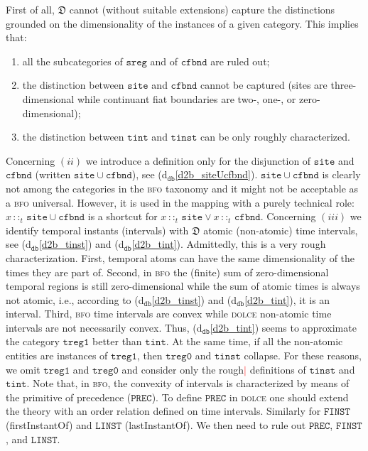 \documentclass[ao]{iosart2x}
\newcommand{\nb}[1]{\textcolor{red}{$|$}\marginpar{\hspace*{-0cm}\parbox{20mm}{\scriptsize\raggedright\textcolor{red}{#1}}}}
\newcommand{\dbDefLabel}{\textrm{d$_\texttt{db}$}}
\newcommand{\refdbdf}[1]{({\dbDefLabel}\ref{#1})}
\newcommand{\pr}[1]{\mathtt{#1}}
\newcommand{\cn}[1]{\mathtt{#1}}
\newcommand{\dolce}{{\textsc{dolce}}}
\newcommand{\bfo}{{\textsc{bfo}}}
\newcommand {\thdolce} {\ensuremath{\mathfrak{D}}}
\newcommand{\sitebcat}{\cn{site}}
\newcommand{\cfbndbcat}{\cn{cfbnd}}
\newcommand{\sregbcat}{\cn{sreg}}
\newcommand{\tinstbcat}{\cn{tinst}}
\newcommand{\tintbcat}{\cn{tint}}
\newcommand{\onetregbcat}{\cn{treg1}}
\newcommand{\zerotregbcat}{\cn{treg0}}
\newcommand{\bfoiof}[1]{{\,::_{#1\:\!}}}
\begin{document}
First of all, {$\thdolce$} cannot (without suitable extensions) capture the distinctions grounded on the dimensionality of the instances of a given category. This implies that: 
\begin{enumerate}[$(i)$]
\item all the subcategories of $\sregbcat$ and of $\cfbndbcat$ are ruled out; 
\item the distinction between $\sitebcat$ and $\cfbndbcat$ cannot be captured (sites are three-dimensional while continuant fiat boundaries are two-, one-, or zero-dimensional); 
\item the distinction between $\tintbcat$ and $\tinstbcat$ can be only roughly characterized.
\end{enumerate} 

Concerning $(ii)$ we introduce a definition only for the disjunction of $\sitebcat$ and $\cfbndbcat$ (written $\sitebcat{\cup}\cfbndbcat$), see \refdbdf{d2b_siteUcfbnd}. $\sitebcat{\cup}\cfbndbcat$ is clearly not among the categories in the {\bfo} taxonomy and it might not be acceptable as a {\bfo} universal. However, it is used in the mapping with a purely technical role: $x \bfoiof{t} \sitebcat{\cup}\cfbndbcat$ is a shortcut for $x \bfoiof{t} \sitebcat \lor x \bfoiof{t}\cfbndbcat$. %
Concerning $(iii)$ we identify temporal instants (intervals) with $\thdolce$ atomic (non-atomic) time intervals, see \refdbdf{d2b_tinst} and \refdbdf{d2b_tint}. Admittedly, this is a very rough characterization. First, temporal atoms can have the same dimensionality of the times they are part of. Second, in {\bfo} the (finite) sum of zero-dimensional temporal regions is still zero-dimensional while the sum of atomic times is always not atomic, i.e., according to \refdbdf{d2b_tinst} and \refdbdf{d2b_tint}, {it is} an interval. Third, {\bfo} time intervals are convex while {\dolce} non-atomic time intervals are not necessarily convex. Thus, \refdbdf{d2b_tint} seems to approximate the category $\onetregbcat$ better than $\tintbcat$. At the same time, if all the non-atomic entities are instances of  $\onetregbcat$, then $\zerotregbcat$ and $\tinstbcat$ collapse. For these reasons, we omit $\onetregbcat$ and $\zerotregbcat$ and 
consider only the rough\nb{SB: perch\`e rough? si pu\`o togliere?} definitions of $\tinstbcat$ and $\tintbcat$. Note that, in {\bfo}, the convexity of intervals is characterized by means of the primitive of precedence ($\pr{PREC}$). To define $\pr{PREC}$ in {\dolce} one should extend the theory with an order relation defined on time intervals. Similarly for $\pr{FINST}$ (firstInstantOf) and $\pr{LINST}$ (lastInstantOf). We then need to rule out $\pr{PREC}$, $\pr{FINST}$, and $\pr{LINST}$.
\end{document}
